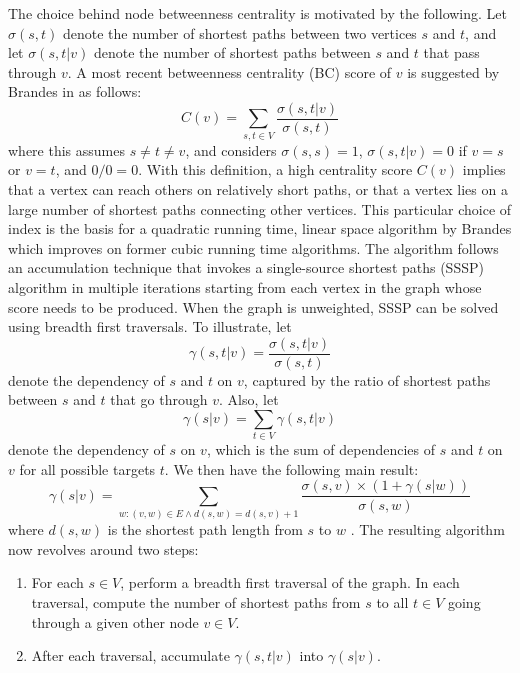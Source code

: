 The choice behind node betweenness centrality is motivated by the following. Let $\sigma(s,t)$ denote the number of shortest paths between two vertices $s$ and $t$, and let $\sigma(s,t \left \vert \right. v)$ denote the number of shortest paths between $s$ and $t$ that pass through $v$. A most recent betweenness centrality (BC) score of $v$ is suggested by Brandes in \cite{Brandes01} as follows:
\begin{equation}
C(v) = \sum_{s,t \in V} \frac{\sigma(s,t \left \vert \right. v)}{\sigma(s,t)}
\label{brandesBC}
\end{equation}
where this assumes $s \neq t \neq v$, and considers $\sigma(s,s)=1$, $\sigma(s,t \left \vert \right. v)=0$ if $v = s$ or $v=t$, and $0/0 = 0$. With this definition, a high centrality score $C(v)$ implies that a vertex can reach others on relatively short paths, or that a vertex lies on a large number of shortest paths connecting other vertices. This particular choice of index is the basis for a quadratic running time, linear space algorithm by Brandes which improves on former cubic running time algorithms. The algorithm follows an accumulation technique that invokes a single-source shortest paths (SSSP) algorithm in multiple iterations starting from each vertex in the graph whose score needs to be produced. When the graph is unweighted, SSSP can be solved using breadth first traversals. To illustrate, let 
\begin{equation*}
\gamma(s, t \left \vert \right. v) = \frac{\sigma(s, t \left \vert \right. v)}{\sigma(s,t)}
\end{equation*}
denote the dependency of $s$ and $t$ on $v$, captured by the ratio of shortest paths between $s$ and $t$ that go through $v$. Also, let 
\begin{equation*}
\gamma(s \left \vert \right. v ) = \sum_{t \in V} \gamma(s,t \left \vert \right. v )
\end{equation*}
denote the dependency of $s$ on $v$, which is the sum of dependencies of $s$ and $t$ on $v$ for all possible targets $t$. 
We then have the following main result:
\begin{equation*}
\gamma(s \left \vert \right. v ) = \sum_{w: (v,w) \in E \land d(s,w) = d(s,v)+1} \frac{\sigma(s,v)\times (1+\gamma(s\left \vert \right. w))}{\sigma(s,w)}
\end{equation*}
where $d(s,w)$ is the shortest path length from $s$ to $w$ \cite{Brandes01}. The resulting algorithm now revolves around two steps:
\begin{enumerate}
\item For each $s \in V$, perform a breadth first traversal of the graph. In each traversal, compute the number of shortest paths from $s$ to all $t \in V$ going through a given other node $v \in V$. 
\item After each traversal, accumulate $\gamma (s,t \left \vert \right. v)$ into $\gamma(s \left \vert \right. v)$.
\end{enumerate}

